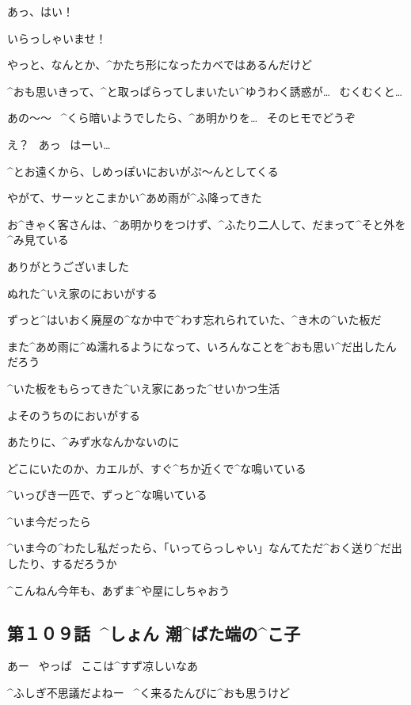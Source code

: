 \Alpha あっ、はい！

\Alpha いらっしゃいませ！

\Alpha やっと、なんとか、^{かたち}{形}になったカベではあるんだけど

\Alpha ^{おも}{思}いきって、^{と}{取}っぱらってしまいたい^{ゆうわく}{誘惑}が…
\ むくむくと…

\page
\Alpha あの〜〜
\ ^{くら}{暗}いようでしたら、^{あ}{明}かりを…
\ そのヒモでどうぞ

\Person え？
\ あっ
\ はーい…

\page
\Alpha ^{とお}{遠}くから、しめっぽいにおいがぷ〜んとしてくる

\Alpha やがて、サーッとこまかい^{あめ}{雨}が^{ふ}{降}ってきた

\Alpha お^{きゃく}{客}さんは、^{あ}{明}かりをつけず、^{ふたり}{二人}して、だまって^{そと}{外}を^{み}{見}ている

\page[124]
\Alpha ありがとうございました

\page
\Alpha ぬれた^{いえ}{家}のにおいがする

\Alpha ずっと^{はいおく}{廃屋}の^{なか}{中}で^{わす}{忘}れられていた、^{き}{木}の^{いた}{板}だ

\Alpha また^{あめ}{雨}に^{ぬ}{濡}れるようになって、いろんなことを^{おも}{思}い^{だ}{出}したんだろう

\page
\Alpha ^{いた}{板}をもらってきた^{いえ}{家}にあった^{せいかつ}{生活}

\Alpha よそのうちのにおいがする

\page
\Alpha あたりに、^{みず}{水}なんかないのに

\Alpha どこにいたのか、カエルが、すぐ^{ちか}{近}くで^{な}{鳴}いている

\page
\Alpha ^{いっぴき}{一匹}で、ずっと^{な}{鳴}いている

\page
\Alpha ^{いま}{今}だったら

\page
\Alpha ^{いま}{今}の^{わたし}{私}だったら、「いってらっしゃい」なんてただ^{おく}{送}り^{だ}{出}したり、するだろうか

\page[132]
\Alpha ^{こんねん}{今年}も、あずま^{や}{屋}にしちゃおう


\subsection{第１０９話\ ^{しょん }{潮}^{ばた}{端}の^{こ}{子}}

\page[137]
\Alpha あー
\ やっぱ
\ ここは^{すず}{凉}しいなあ

\Alpha ^{ふしぎ}{不思議}だよねー
\ ^{く}{来}るたんびに^{おも}{思}うけど

